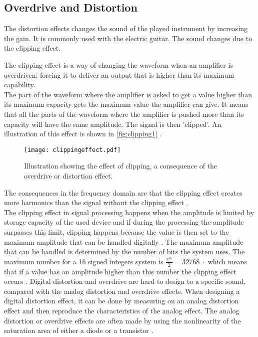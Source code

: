 \subsection{Overdrive and Distortion}\label{sec:overdrive} 

The distortion effects changes the sound of the played instrument by increasing the gain. It is commonly used with the electric guitar. The sound changes due to the clipping effect. \\

The clipping effect is a way of changing the waveform when an amplifier is overdriven; forcing it to deliver an output that is higher than its maximum capability. \\
The part of the waveform where the amplifier is asked to get a value higher than its maximum capacity gets the maximum value the amplifier can give. It means that all the parts of the waveform where the amplifier is pushed more than its capacity will have the same amplitude. The signal is then 'clipped'. An illustration of this effect is shown in \autoref{fig:clipping1} \citep{distortion_clipping1}.\\

\begin{figure} [htbp]
	\centering
  \texttt{[image: clippingeffect.pdf]}
  \caption{Illustration showing the effect of clipping, a consequence of the overdrive or distortion effect.}
  \label{fig:clipping1}
\end{figure} \citep{distortion_clipping1}


The consequences in the frequency domain are that the clipping effect creates more harmonics than the signal without the clipping effect \citep{distortion_harmonics}. \\

The clipping effect in signal processing happens when the amplitude is limited by storage capacity of the used device and if during the processing the amplitude surpasses this limit, clipping happens because the value is then set to the maximum amplitude that can be handled digitally \citep{distortion_digital}. The maximum amplitude that can be handled is determined by the number of bits the system uses. The maximum number for a \SI{16}{\bit}  signed integers system is $\frac{2^{16}}{2} = \SI{32768}{\cdot}$ which means that if a value has an amplitude higher than this number the clipping effect occurs \citep{distortion_digitalcalc}. 
Digital distortion and overdrive are hard to design to a specific sound, compared with the analog distortion and overdrive effects. When designing a digital distortion effect, it can be done by measuring on an analog distortion effect and then reproduce the characteristics of the analog effect. The analog distortion or overdrive effects are often made by using the nonlinearity of the saturation area of either a diode or a transistor \citep{CCRMA}. 

